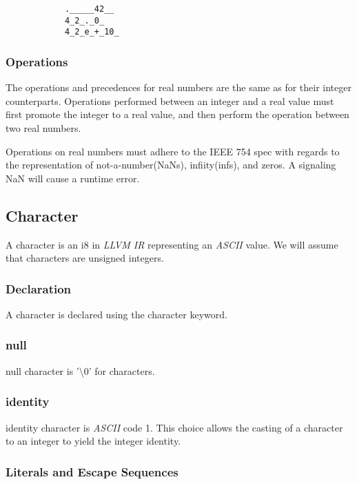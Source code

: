 \documentclass[../../gazprea.tex]{subfiles}
\begin{document}
		\begin{lstlisting}
			._____42__
			4_2_._0_
			4_2_e_+_10_
		\end{lstlisting}

	\subsubsection{Operations}

		The operations and precedences for real numbers are the same as for their integer counterparts. Operations
		performed between an integer and a real value must first promote the integer to a real value, and then perform
		the operation between two real numbers.

		Operations on real numbers must adhere to the \textsf{IEEE 754} spec with regards to the representation of
		not-a-number(NaNs), infiity(infs), and zeros. A signaling NaN will cause a runtime error.


	\subsection{Character}\label{sec:character}

		A character is an \textsf{i8} in \textit{LLVM IR} representing an \textit{ASCII} value. We will assume that
		characters are unsigned integers.

	\subsubsection{Declaration}

		A character is declared using the \textsf{character} keyword.

	\subsubsection{null}

		\textsf{null} character is \textsf{'\textbackslash0'} for characters.

	\subsubsection{identity}

		\textsf{identity} character is \textit{ASCII} code 1. This choice allows the casting of a character to an
		integer to yield the integer identity.


	\subsubsection{Literals and Escape Sequences}
\end{document}
